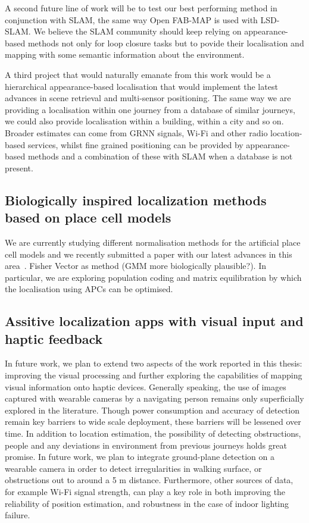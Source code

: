 A second future line of work will be to test our best performing method in conjunction with SLAM, the same way Open FAB-MAP is used with LSD-SLAM. We believe the SLAM community should keep relying on appearance-based methods not only for loop closure tasks but to povide their localisation and mapping with some semantic information about the environment.

A third project that would naturally emanate from this work would be a hierarchical appearance-based localisation that would implement the latest advances in scene retrieval and multi-sensor positioning. The same way we are providing a localisation within one journey from a database of similar journeys, we could also provide localisation within a building, within a city and so on. Broader estimates can come from GRNN signals, Wi-Fi and other radio location-based services, whilst fine grained positioning can be provided by appearance-based methods and a combination of these with SLAM when a database is not present.

\subsection{Biologically inspired localization methods based on place cell models}

We are currently studying different normalisation methods for the artificial place cell models and we recently submitted a paper with our latest advances in this area~\cite{Rivera-Rubio2015tnnls}. 
Fisher Vector as method (GMM more biologically plausible?). In particular, we are exploring population coding and matrix equilibration by which the localisation using APCs can be optimised.


\subsection{Assitive localization apps with visual input and haptic feedback}

In future work, we plan to extend two aspects of the work reported in this thesis: improving the visual processing and further exploring the capabilities of mapping visual information onto haptic devices. Generally speaking, the use of images captured with wearable cameras by a navigating person remains only superficially explored in the literature. Though power consumption and accuracy of detection remain key barriers to wide scale deployment, these barriers will be lessened over time. In addition to location estimation, the possibility of detecting obstructions, people and any deviations in environment from previous journeys holds great promise. In future work, we plan to integrate ground-plane detection on a wearable camera in order to detect irregularities in walking surface, or obstructions out to around a 5 m distance. Furthermore, other sources of data, for example Wi-Fi signal strength, can play a key role in both improving the reliability of position estimation, and robustness in the case of indoor lighting failure.

